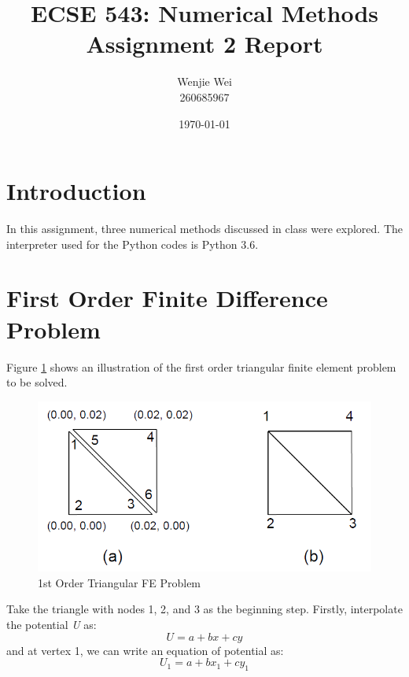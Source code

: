 \documentclass[a4paper,titlepage]{article}
\title{\textbf{ECSE 543: Numerical Methods} \\ Assignment 2 Report}
\author{Wenjie Wei \\ 260685967}
\date{\today}
\begin{document}
	\sloppy
	\maketitle
	
	\tableofcontents
	\newpage
	
	\section*{Introduction}
		In this assignment, three numerical methods discussed in class were explored. The interpreter used for the Python codes is Python 3.6. 
		
	\section{First Order Finite Difference Problem}
		Figure \ref{prob} shows an illustration of the first order triangular finite element problem to be solved. 
		\begin{figure}[!h]
			\centering
			\includegraphics[width=0.7\linewidth]{prob}
			\caption{1st Order Triangular FE Problem}
			\label{prob}
		\end{figure}
	
		Take the triangle with nodes 1, 2, and 3 as the beginning step. Firstly, interpolate the potential \textit{U} as:
		$$
			U = a + bx + cy
		$$
		and at vertex 1, we can write an equation of potential as:
		$$
			U_1 = a + bx_1 + cy_1
		$$
		
\end{document}
